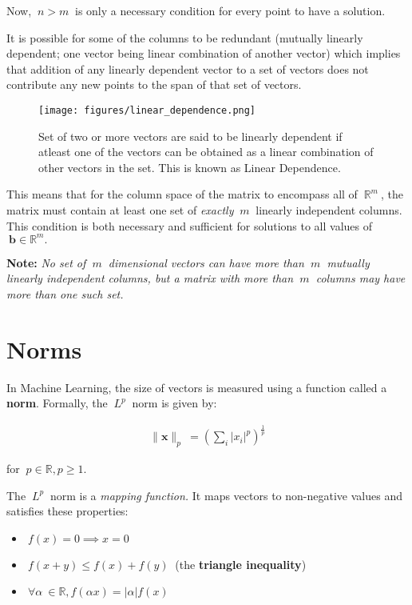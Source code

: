 \documentclass[12pt]{article}
\begin{document}
Now, $\ n>m\ $ is only a necessary condition for every point to have a solution.

It is possible for some of the columns to be redundant (mutually linearly dependent; one vector being linear combination of another vector) which implies that addition of any linearly dependent vector to a set of vectors does not contribute any new points to the span of that set of vectors.

\begin{figure}[h]
\texttt{[image: figures/linear\_dependence.png]}
\caption{Set of two or more vectors are said to be linearly dependent if atleast one of the vectors can be obtained as a linear combination of other vectors in the set. This is known as Linear Dependence.}
\end{figure}

This means that for the column space of the matrix to encompass all of $\ \mathbb{R}^{m}\ $, the matrix must contain at least one set of \textit{exactly} $\ m\ $ linearly independent columns. This condition is both necessary and sufficient for solutions to all values of $\ \mathbf{b}\in\mathbb{R}^{m}.$

\textbf{Note:} \textit{No set of $\ m\ $ dimensional vectors can have more than $\ m\ $ mutually linearly independent columns, but a matrix with more than $\ m\ $ columns may have more than one such set.}

\section{Norms}

In Machine Learning, the size of vectors is measured using a function called a \textbf{norm}. Formally, the $\ L^{p}\ $ norm is given by:

\begin{align}
\|\mathbf{x}\|_{p} \  = \left( \sum_i \left| x_i \right| ^p \right) ^ {\frac {1}{p}}
\end{align}

for $\ p \in \mathbb{R}, p \ge 1. \ $

The $\ L^{p}\ $ norm is a \textit{mapping function.} It maps vectors to non-negative values and satisfies these properties:

\begin{itemize}
    \item $\ f(x) = 0 \implies x = 0 \ $
    \item $\ f(x+y) \le f(x) + f(y)\ $ (the \textbf{triangle inequality})
    \item $\ \forall \alpha \ \in \mathbb{R}, f(\alpha x) = \left| \alpha \right|f(x) \ $
\end{itemize}
\end{document}
